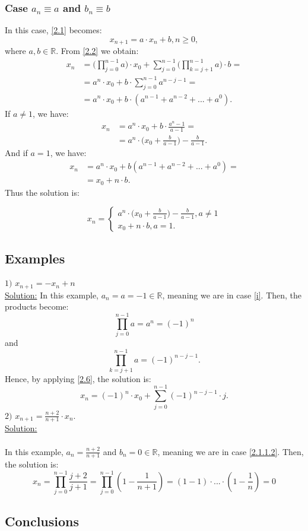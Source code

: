\documentclass[a4paper,11pt]{report}
\newcommand{\R}{\mathbb{R}}
\begin{document}
\subsubsection{Case $a_{n}\equiv a$ and $b_{n}\equiv b$}
In this case, \eqref{2.1} becomes:
\begin{equation}
 x_{n+1}=a\cdot x_{n}+b, n\geq 0,
\end{equation}
where $a,b\in \R$.
From \eqref{2.2} we obtain:
\begin{align*}
 x_{n} &= \bigg(\prod_{j=0}^{n-1} a \bigg)\cdot x_{0}+\sum_{j=0}^{n-1}\bigg(\prod_{k=j+1}^{n-1}a\bigg)\cdot b=\\
 &=a^{n}\cdot x_{0}+b\cdot \sum_{j=0}^{n-1} a^{n-j-1}=\\
 &=a^{n}\cdot x_{0}+b\cdot (a^{n-1}+a^{n-2}+...+a^{0}).
\end{align*}
If $a \neq 1$, we have:
\begin{align*}
 x_{n}&=a^{n}\cdot x_{0}+b\cdot \frac{a^{n}-1}{a-1}=\\
 &= a^{n}\cdot \bigg(x_{0}+\frac{b}{a-1}\bigg)-\frac{b}{a-1}.
\end{align*}
And if $a=1$, we have:
\begin{align*}
 x_{n}&=a^{n}\cdot x_{0}+b(a^{n-1}+a^{n-2}+...+a^{0})=\\
 &=x_{0}+n\cdot b.
\end{align*}
Thus the solution is:

 $$x_{n}=\begin{cases}
        a^{n}\cdot \big(x_{0}+\frac{b}{a-1}\big)-\frac{b}{a-1}, a\neq 1 \\
        x_{0}+n\cdot b, a=1.
       \end{cases}
$$

\subsection{Examples}
$1)$ $x_{n+1}=-x_{n}+n$\\
\underline{Solution:}
In this example, $a_{n}=a=-1\in\R$, meaning we are in case \ref{i}. Then, the products become:
$$ \prod_{j=0}^{n-1} a=a^{n}=(-1)^{n}$$
and 
$$\prod_{k=j+1}^{n-1} a=(-1)^{n-j-1}.$$ 
Hence, by applying \eqref{2.6}, the solution is:
$$x_{n}=(-1)^{n}\cdot x_{0}+\sum_{j=0}^{n-1} (-1)^{n-j-1}\cdot j.$$
$2)$ $x_{n+1}=\frac{n+2}{n+1}\cdot x_{n}$.\\
\underline{Solution:}\\ \\
In this example, $a_{n}=\frac{n+2}{n+1}$ and $b_{n}=0 \in \R$, meaning we are in case \ref{2.1.1.2}. Then, the solution is:
$$ x_{n}=\prod_{j=0}^{n-1} \frac{j+2}{j+1}=\prod_{j=0}^{n-1} (1-\frac{1}{n+1})=(1-1)\cdot ...\cdot (1-\frac{1}{n})=0$$
\subsection{Conclusions}
\end{document}
